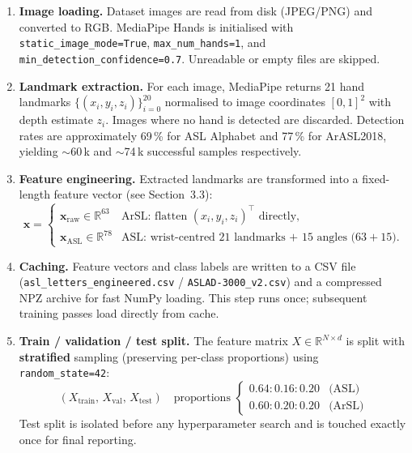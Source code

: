 \begin{enumerate}

\item \textbf{Image loading.} Dataset images are read from disk (JPEG/PNG) and converted to RGB. MediaPipe Hands is initialised with \texttt{static\_image\_mode=True}, \texttt{max\_num\_hands=1}, and \texttt{min\_detection\_confidence=0.7}. Unreadable or empty files are skipped.

\item \textbf{Landmark extraction.} For each image, MediaPipe returns 21 hand landmarks $\{(x_i, y_i, z_i)\}_{i=0}^{20}$ normalised to image coordinates $[0,1]^2$ with depth estimate $z_i$. Images where no hand is detected are discarded. Detection rates are approximately 69\,\% for ASL Alphabet and 77\,\% for ArASL2018, yielding $\sim$60\,k and $\sim$74\,k successful samples respectively.

\item \textbf{Feature engineering.} Extracted landmarks are transformed into a fixed-length feature vector (see Section~3.3):
\[
\mathbf{x} = \begin{cases} \mathbf{x}_{\text{raw}} \in \mathbb{R}^{63} & \text{ArSL: flatten } (x_i, y_i, z_i)^\top \text{ directly,} \\ \mathbf{x}_{\text{ASL}} \in \mathbb{R}^{78} & \text{ASL: wrist-centred 21 landmarks + 15 angles ($63{+}15$).}\end{cases}
\]

\item \textbf{Caching.} Feature vectors and class labels are written to a CSV file (\texttt{asl\_letters\_engineered.csv} / \texttt{ASLAD-3000\_v2.csv}) and a compressed NPZ archive for fast NumPy loading. This step runs once; subsequent training passes load directly from cache.

\item \textbf{Train / validation / test split.} The feature matrix $X \in \mathbb{R}^{N \times d}$ is split with \textbf{stratified} sampling (preserving per-class proportions) using \texttt{random\_state=42}:
\begin{equation}
\label{eq:ch3-split}
(X_{\text{train}},\, X_{\text{val}},\, X_{\text{test}}) \quad \text{proportions } \begin{cases} 0.64 : 0.16 : 0.20 & \text{(ASL)} \\ 0.60 : 0.20 : 0.20 & \text{(ArSL)} \end{cases}
\end{equation}
Test split is isolated before any hyperparameter search and is touched exactly once for final reporting.


\end{enumerate}
